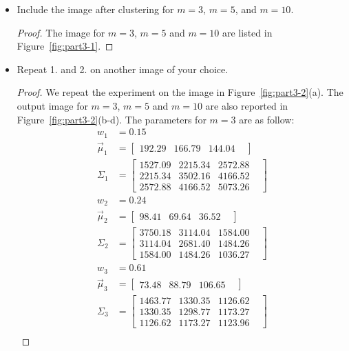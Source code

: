 \documentclass[12pt]{article}
\newcommand{\1}{\mathbf{1}}
\begin{document}
{\begin{itemize}
\begin{proof}
  \end{proof}
  \item Include the image after clustering for $m=3$, $m=5$, and $m=10$.
  \begin{proof}
    The image for $m=3$, $m=5$ and $m=10$ are listed in Figure~\ref{fig:part3-1}.
  \end{proof}
  \item Repeat 1. and 2. on another image of your choice.
  \begin{proof}
    We repeat the experiment on the image in Figure~\ref{fig:part3-2}(a). The output image for $m=3$, $m=5$ and $m=10$ are also reported in Figure~\ref{fig:part3-2}(b-d). The parameters for $m=3$ are as follow:
    \begin{align*}
w_{1} & = 0.15 \\
\vec{\mu}_{1} &= \begin{bmatrix} 192.29 &  166.79 &  144.04 &  \end{bmatrix} \\
\Sigma_{1} &= \begin{bmatrix} 1527.09 &  2215.34 &  2572.88 &  \\2215.34 &  3502.16 &  4166.52 &  \\2572.88 &  4166.52 &  5073.26 &  \end{bmatrix} \\
w_{2} & = 0.24 \\
\vec{\mu}_{2} &= \begin{bmatrix} 98.41 &  69.64 &  36.52 &  \end{bmatrix} \\
\Sigma_{2} &= \begin{bmatrix} 3750.18 &  3114.04 &  1584.00 &  \\3114.04 &  2681.40 &  1484.26 &  \\1584.00 &  1484.26 &  1036.27 &  \end{bmatrix} \\
w_{3} & = 0.61 \\
\vec{\mu}_{3} &= \begin{bmatrix} 73.48 &  88.79 &  106.65 &  \end{bmatrix} \\
\Sigma_{3} &= \begin{bmatrix} 1463.77 &  1330.35 &  1126.62 &  \\1330.35 &  1298.77 &  1173.27 &  \\1126.62 &  1173.27 &  1123.96 &  \end{bmatrix} \\

\end{align*}
\end{proof}
\end{itemize}}
\end{document}
